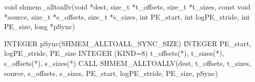 
\begin{apidefinition}

\begin{Csynopsis}
void shmem_alltoallv(void *dest, size_t *t_offsets, size_t *t_sizes, const void *source, size_t *s_offsets, size_t *s_sizes, int PE_start, int logPE_stride, int PE_size, long *pSync)
\end{Csynopsis}

\begin{Fsynopsis}
INTEGER pSync(SHMEM_ALLTOALL_SYNC_SIZE)
INTEGER PE_start, logPE_stride, PE_size
INTEGER (KIND=8) t_offsets(*), t_sizes(*), s_offsets(*), s_sizes(*)
CALL SHMEM_ALLTOALLV(dest, t_offsets, t_sizes, source, s_offsets, s_sizes, PE_start, logPE_stride, PE_size, pSync)
\end{Fsynopsis}


\end{apidefinition}
